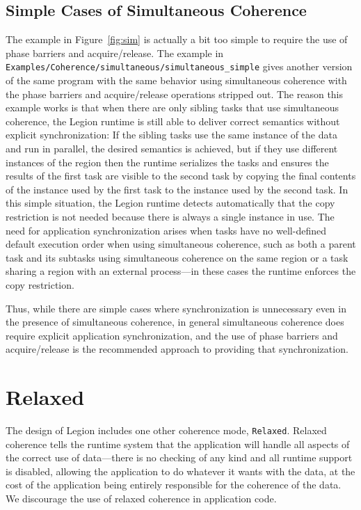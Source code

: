 \subsection{Simple Cases of Simultaneous Coherence}

The example in Figure~\ref{fig:sim} is actually a bit too simple to require the use of phase barriers and acquire/release.  The example in \\ {\tt Examples/Coherence/simultaneous/simultaneous\_simple} gives another version of the same program with the same behavior using simultaneous coherence with the phase barriers and acquire/release operations stripped out.  The reason this example works is that when there are only sibling tasks that use simultaneous coherence, the Legion runtime is still able to deliver correct semantics without explicit synchronization:  If the sibling tasks use the same instance of the data and run in parallel, the desired semantics is achieved, but if they use different instances of the region then the runtime serializes the tasks and ensures the results of the first task are visible to the second task by copying the final contents of the instance used by the first task to the instance used by the second task.  In this simple situation, the Legion runtime detects automatically that the copy restriction is not needed because there is always a single instance in use.  The need for application synchronization arises when tasks have no well-defined default execution order when using simultaneous coherence, such as both a parent task and its subtasks using simultaneous coherence on the same region or a task sharing a region with an external process---in these cases the runtime enforces the copy restriction.

Thus, while there are simple cases where synchronization is unnecessary even in the presence of simultaneous coherence, in general simultaneous coherence does require explicit application synchronization, and the use of phase barriers and acquire/release is the recommended approach to providing that synchronization.

\section{Relaxed}
\label{sec:relaxed}

The design of Legion includes one other coherence mode, {\tt Relaxed}.
Relaxed coherence tells the runtime system that the application will
handle all aspects of the correct use of data---there is no checking
of any kind and all runtime support is disabled, allowing the
application to do whatever it wants with the data, at the cost of the
application being entirely responsible for the coherence of the data.
We discourage the use of relaxed coherence in application code.


